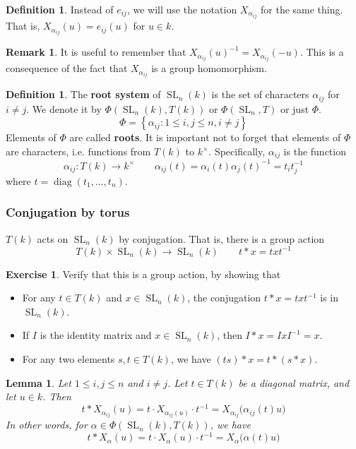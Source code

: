 \documentclass[12pt]{article}
\newtheorem{lemma}[theorem]{Lemma}
\theoremstyle{definition}
\newtheorem{definition}[theorem]{Definition}
\newtheorem{remark}[theorem]{Remark}
\newtheorem{exercise}[theorem]{Exercise}
\newcommand{\lb}{\left\{}
\newcommand{\rb}{\right\}}
\newcommand{\tbf}{\textbf}
\newcommand{\inv}{^{-1}}
\DeclareMathOperator{\SL}{SL}
\DeclareMathOperator{\diag}{diag}
\begin{document}
\begin{definition}
Instead of $e_{ij}$, we will use the notation $X_{\alpha_{ij}}$ for the same thing. That is, $X_{\alpha_{ij}}(u) = e_{ij}(u)$ for $u \in k$.
\end{definition}

\begin{remark}
It is useful to remember that $X_{\alpha_{ij}}(u) \inv = X_{\alpha_{ij}}(-u)$. This is a consequence of the fact that $X_{\alpha_{ij}}$ is a group homomorphism.
\end{remark}

\begin{definition}
The \tbf{root system} of $\SL_n(k)$ is the set of characters $\alpha_{ij}$ for $i \neq j$. We denote it by $\Phi(\SL_n(k), T(k))$ or $\Phi(\SL_n, T)$ or just $\Phi$.
\[
	\Phi = \lb \alpha_{ij} : 1 \le i, j \le n, i \neq j \rb
\]
Elements of $\Phi$ are called \tbf{roots}. It is important not to forget that elements of $\Phi$ are characters, i.e. functions from $T(k)$ to $k^\times$. Specifically, $\alpha_{ij}$ is the function
\[
	\alpha_{ij}:T(k) \to k^\times \qquad \alpha_{ij}(t) = \alpha_i(t) \alpha_j(t) \inv = t_i t_j \inv
\]
where $t = \diag(t_1, \ldots, t_n)$.
\end{definition}


\subsubsection{Conjugation by torus}

$T(k)$ acts on $\SL_n(k)$ by conjugation. That is, there is a group action 
\[
	T(k) \times \SL_n(k) \to \SL_n(k) \qquad t * x = txt \inv
\]

\begin{exercise}
Verify that this is a group action, by showing that
\begin{itemize}
	\item For any $t \in T(k)$ and $x \in \SL_n(k)$, the conjugation $t*x = txt \inv$ is in $\SL_n(k)$.
	\item If $I$ is the identity matrix and $x \in \SL_n(k)$, then $I * x = Ix I \inv = x$.
	\item For any two elements $s, t \in T(k)$, we have $(ts) * x  = t * (s * x)$. 
\end{itemize}
\end{exercise}


\begin{lemma}
Let $1 \le i,j \le n$ and $i \neq j$. Let $t \in T(k)$ be a diagonal matrix, and let $u \in k$. Then
\[
	t * X_{\alpha_{ij}}(u) = t \cdot X_{\alpha_{ij}(u)} \cdot t \inv = X_{\alpha_{ij}} \Big( \alpha_{ij}(t) u \Big)
\]
In other words, for $\alpha \in \Phi(\SL_n(k), T(k))$, we have
\[
	t * X_\alpha(u) = t \cdot X_\alpha(u) \cdot t \inv = X_\alpha \Big( \alpha(t) u \Big)
\]
\end{lemma}
\end{document}
